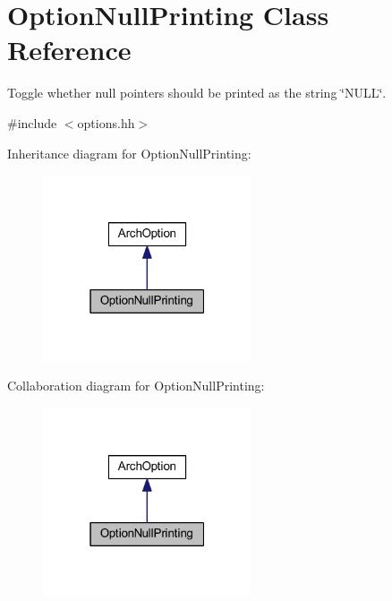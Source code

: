 \hypertarget{class_option_null_printing}{}\section{Option\+Null\+Printing Class Reference}
\label{class_option_null_printing}


Toggle whether null pointers should be printed as the string \char`\"{}\+N\+U\+L\+L\char`\"{}.  




{\ttfamily \#include $<$options.\+hh$>$}



Inheritance diagram for Option\+Null\+Printing\+:
\nopagebreak
\begin{figure}[H]
\begin{center}
\leavevmode
\includegraphics[width=175pt]{class_option_null_printing__inherit__graph}
\end{center}
\end{figure}


Collaboration diagram for Option\+Null\+Printing\+:
\nopagebreak
\begin{figure}[H]
\begin{center}
\leavevmode
\includegraphics[width=175pt]{class_option_null_printing__coll__graph}
\end{center}
\end{figure}
